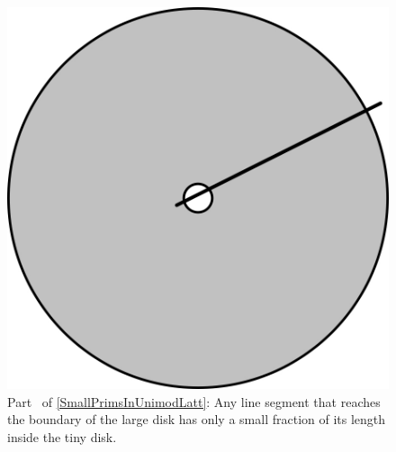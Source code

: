 \begin{figure}[ht]
\begin{center}
\includegraphics{PDF/line-seg-in-small-disk.jpg}
\end{center}
\caption{Part~ of \cref{SmallPrimsInUnimodLatt}: Any line segment that reaches the boundary of the large disk has only a small fraction of its length inside the tiny disk.}
\label{LineSegSmallTimeInSmallDisk}
\end{figure}
%
%
%
%
%
%

